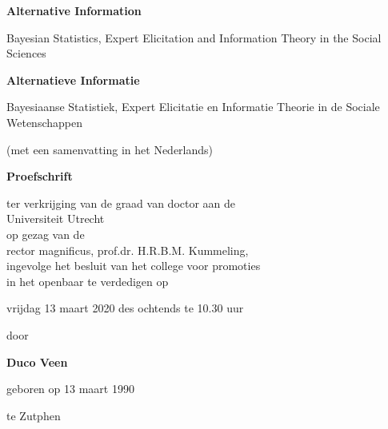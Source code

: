 \documentclass[openright,titlepage,12pt,a4paper]{book}
\title{}
\subtitle{Alternative Information: Bayesian Statistics, Expert Elicitation and Information Theory in the Social Sciences}
\author{Duco Veen}
\date{Department of Methodology \& Statistics, Utrecht University}
\begin{document}

\begin{center}
\huge{\textbf{Alternative Information}}


\Large{Bayesian Statistics, Expert Elicitation and Information Theory in the Social Sciences}

\vspace*{1cm}

\large{\textbf{Alternatieve Informatie}}

\normalsize{Bayesiaanse Statistiek, Expert Elicitatie en Informatie Theorie in de Sociale Wetenschappen}

\vspace*{.3cm}

\normalsize{(met een samenvatting in het Nederlands)}



\vspace*{2cm}

\Large{\textbf{Proefschrift}}

\vspace*{3cm}

\normalsize

ter verkrijging van de graad van doctor aan de \\
Universiteit Utrecht \\
op gezag van de \\
rector magnificus, prof.dr. H.R.B.M. Kummeling, \\
ingevolge het besluit van het college voor promoties \\
in het openbaar te verdedigen op

\vspace*{.5cm}

vrijdag 13 maart 2020 des ochtends te 10.30 uur


\vspace*{1.5cm}

door


\vspace*{1.5cm}

\Large{\textbf{Duco Veen}}
\normalsize

\vspace*{1cm}

geboren op 13 maart 1990

te Zutphen

\end{center}

\end{document}

